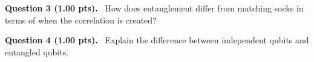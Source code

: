 \documentclass[12pt,a4paper]{article}
\begin{document}
\vspace{0.5em}


\noindent
\textbf{Question 3 (1.00 pts).}~
How does entanglement differ from matching socks in terms of when the correlation is created?


\vspace{0.4cm}
\noindent\makebox[\linewidth]{\hrulefill}
\vspace{0.6cm}



\vspace{0.5em}


\noindent
\textbf{Question 4 (1.00 pts).}~
Explain the difference between independent qubits and entangled qubits.


\vspace{0.4cm}
\noindent\makebox[\linewidth]{\hrulefill}
\vspace{0.4cm}
\noindent\makebox[\linewidth]{\hrulefill}
\vspace{0.4cm}
\noindent\makebox[\linewidth]{\hrulefill}
\vspace{0.6cm}
\end{document}
